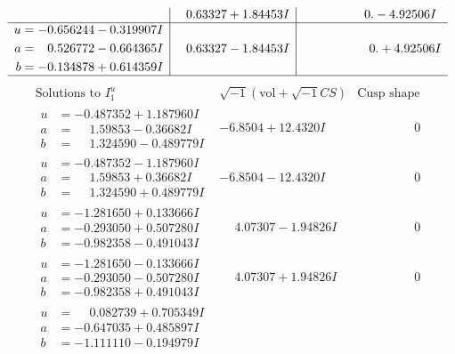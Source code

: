\documentclass[1p]{elsarticle_modified}
\theoremstyle{definition}
\newcommand{\I}{\sqrt{-1}}
\begin{document}
$$\begin{array}{c|c|c}
 & \phantom{-}0.63327 + 1.84453 I & \phantom{-0.000000 } 0. - 4.92506 I \\ \hline\begin{aligned}
u &= -0.656244 - 0.319907 I \\
a &= \phantom{-}0.526772 - 0.664365 I \\
b &= -0.134878 + 0.614359 I\end{aligned}
 & \phantom{-}0.63327 - 1.84453 I & \phantom{-0.000000 -}0. + 4.92506 I\\
 \hline 
 \end{array}$$\newpage$$\begin{array}{c|c|c}  
\text{Solutions to }I^u_{1}& \I (\text{vol} + \sqrt{-1}CS) & \text{Cusp shape}\\
 \hline 
\begin{aligned}
u &= -0.487352 + 1.187960 I \\
a &= \phantom{-}1.59853 - 0.36682 I \\
b &= \phantom{-}1.324590 - 0.489779 I\end{aligned}
 & -6.8504 + 12.4320 I & \phantom{-0.000000 } 0 \\ \hline\begin{aligned}
u &= -0.487352 - 1.187960 I \\
a &= \phantom{-}1.59853 + 0.36682 I \\
b &= \phantom{-}1.324590 + 0.489779 I\end{aligned}
 & -6.8504 - 12.4320 I & \phantom{-0.000000 } 0 \\ \hline\begin{aligned}
u &= -1.281650 + 0.133666 I \\
a &= -0.293050 + 0.507280 I \\
b &= -0.982358 - 0.491043 I\end{aligned}
 & \phantom{-}4.07307 - 1.94826 I & \phantom{-0.000000 } 0 \\ \hline\begin{aligned}
u &= -1.281650 - 0.133666 I \\
a &= -0.293050 - 0.507280 I \\
b &= -0.982358 + 0.491043 I\end{aligned}
 & \phantom{-}4.07307 + 1.94826 I & \phantom{-0.000000 } 0 \\ \hline\begin{aligned}
u &= \phantom{-}0.082739 + 0.705349 I \\
a &= -0.647035 + 0.485897 I \\
b &= -1.111110 - 0.194979 I\end{aligned}

\end{array}$$
\end{document}

